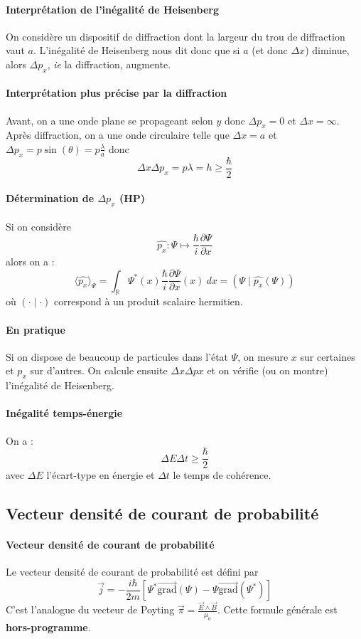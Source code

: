 \documentclass[french]{book}
\theoremstyle{plain}
\theoremstyle{definition}
\theoremstyle{remark}
\newcommand{\R}{\mathbb{R}}
\newcommand{\st}{^*}
\newcommand{\grad}{\overrightarrow{\text{grad}}}
\begin{document}
\paragraph{Interprétation de l'inégalité de Heisenberg} On considère un dispositif de diffraction dont la largeur du trou de diffraction vaut $a$. L'inégalité de Heisenberg nous dit donc que si $a$ (et donc $\Delta x$) diminue, alors $\Delta p_x$, \textit{ie} la diffraction, augmente.
\paragraph{Interprétation plus précise par la diffraction} Avant, on a une onde plane se propageant selon $y$ donc $\Delta p_x=0$ et $\Delta x=\infty$. Après diffraction, on a une onde circulaire telle que $\Delta x=a$ et $\displaystyle\Delta p_x=p\sin(\theta)=p\frac{\lambda}{a}$ donc $$\Delta x\Delta p_x=p\lambda=h\geqslant\frac{\hbar}{2}$$
\paragraph{Détermination de $\Delta p_x$ (HP)} Si on considère $$\hat{p_x}:\Psi\mapsto\frac{\hbar}{i}\frac{\partial\Psi}{\partial x}$$ alors on a : $$\langle \hat{p_x} \rangle_\Psi=\int_\R \Psi\st(x)\frac{\hbar}{i}\frac{\partial\Psi}{\partial x}(x) \ dx=\left(\Psi \mid \hat{p_x}(\Psi)\right)$$ où $\left(\cdot\mid\cdot\right)$ correspond à un produit scalaire hermitien.
\paragraph{En pratique} Si on dispose de beaucoup de particules dans l'état $\Psi$, on mesure $x$ sur certaines et $p_x$ sur d'autres. On calcule ensuite $\Delta x\Delta px$ et on vérifie (ou on montre) l'inégalité de Heisenberg.
\paragraph{Inégalité temps-énergie} On a : $$\Delta E\Delta t\geqslant\frac{\hbar}{2}$$ avec $\Delta E$ l'écart-type en énergie et $\Delta t$ le temps de cohérence.
\subsection{Vecteur densité de courant de probabilité}
\paragraph{Vecteur densité de courant de probabilité} Le vecteur densité de courant de probabilité est défini par $$\overrightarrow{j}=-\frac{i\hbar}{2m}\left[\Psi\st\grad(\Psi)-\Psi\grad(\Psi\st)\right]$$ C'est l'analogue du vecteur de Poyting $\overrightarrow{\pi}=\displaystyle\frac{\overrightarrow{E}\wedge\overrightarrow{B}}{\mu_0}$. Cette formule générale est \textbf{hors-programme}.
\end{document}
